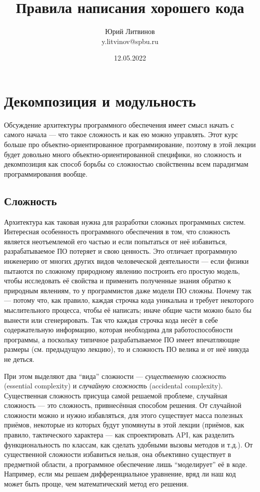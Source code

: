 \documentclass[a5paper]{article}
\title{Правила написания хорошего кода}
\author{Юрий Литвинов\\\small{y.litvinov@spbu.ru}}
\date{12.05.2022}
\begin{document}
\maketitle
\thispagestyle{empty}

\section{Декомпозиция и модульность}


Обсуждение архитектуры программного обеспечения имеет смысл начать с самого начала --- что такое сложность и как ею можно управлять. Этот курс больше про объектно-ориентированное программирование, поэтому в этой лекции будет довольно много объектно-ориентированной специфики, но сложность и декомпозиция как способ борьбы со сложностью свойственны всем парадигмам программирования вообще.

\subsection{Сложность}

Архитектура как таковая нужна для разработки сложных программных систем. Интересная особенность программного обеспечения в том, что сложность является неотъемлемой его частью и если попытаться от неё избавиться, разрабатываемое ПО потеряет и свою ценность. Это отличает программную инженерию от многих других видов человеческой деятельности --- если физики пытаются по сложному природному явлению построить его простую модель, чтобы исследовать её свойства и применить полученные знания обратно к природным явлениям, то у программистов даже модели ПО сложны. Почему так --- потому что, как правило, каждая строчка кода уникальна и требует некоторого мыслительного процесса, чтобы её написать; иначе общие части можно было бы вынести или сгенерировать. Так что каждая строчка кода несёт в себе содержательную информацию, которая необходима для работоспособности программы, а поскольку типичное разрабатываемое ПО имеет впечатляющие размеры (см. предыдущую лекцию), то и сложность ПО велика и от неё никуда не деться.

При этом выделяют два ``вида'' сложности --- \textit{существенную сложность} (essential complexity) и \textit{случайную сложность} (accidental complexity). Существенная сложность присуща самой решаемой проблеме, случайная сложность --- это сложность, привнесённая способом решения. От случайной сложности можно и нужно избавляться, для этого существует масса полезных приёмов, некоторые из которых будут упомянуты в этой лекции (приёмов, как правило, тактического характера --- как спроектировать API, как разделить функциональность по классам, как сделать удобными вызовы методов и т.д.). От существенной сложности избавиться нельзя, она объективно существует в предметной области, а программное обеспечение лишь ``моделирует'' её в коде. Например, если мы решаем дифференциальное уравнение, вряд ли наш код может быть проще, чем математический метод его решения.
\end{document}
